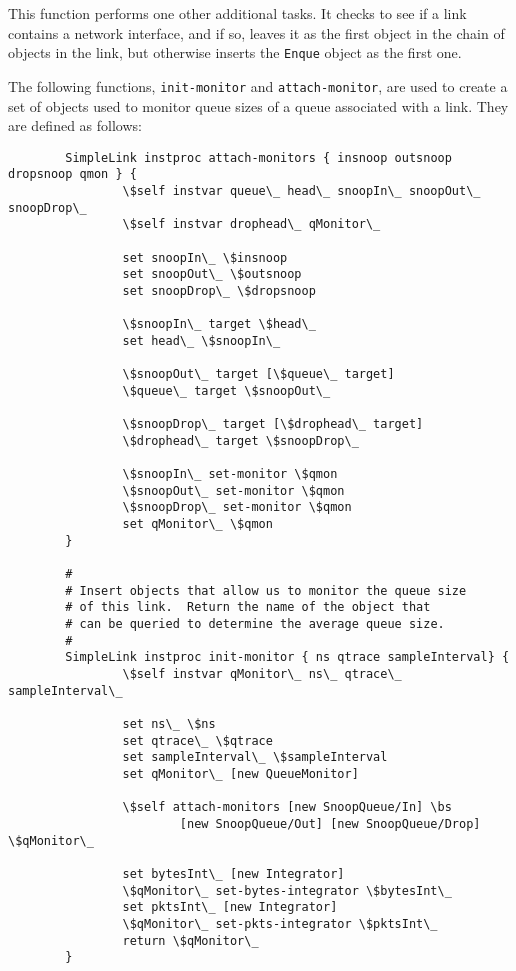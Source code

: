 This function performs one other  additional tasks.
It checks to see if a link contains a network interface,
and if so, leaves it as the first object in the chain of objects
in the link, but otherwise inserts the {\tt Enque} object as
the first one.

The following functions, {\tt init-monitor} and
{\tt attach-monitor}, are used to create a set of
objects used to monitor queue sizes of a queue associated
with a link.
They are defined as follows:
\begin{verbatim}
        SimpleLink instproc attach-monitors { insnoop outsnoop dropsnoop qmon } {
                \$self instvar queue\_ head\_ snoopIn\_ snoopOut\_ snoopDrop\_
                \$self instvar drophead\_ qMonitor\_

                set snoopIn\_ \$insnoop
                set snoopOut\_ \$outsnoop
                set snoopDrop\_ \$dropsnoop

                \$snoopIn\_ target \$head\_
                set head\_ \$snoopIn\_

                \$snoopOut\_ target [\$queue\_ target]
                \$queue\_ target \$snoopOut\_

                \$snoopDrop\_ target [\$drophead\_ target]
                \$drophead\_ target \$snoopDrop\_

                \$snoopIn\_ set-monitor \$qmon
                \$snoopOut\_ set-monitor \$qmon
                \$snoopDrop\_ set-monitor \$qmon
                set qMonitor\_ \$qmon
        }

        #
        # Insert objects that allow us to monitor the queue size
        # of this link.  Return the name of the object that
        # can be queried to determine the average queue size.
        #
        SimpleLink instproc init-monitor { ns qtrace sampleInterval} {
                \$self instvar qMonitor\_ ns\_ qtrace\_ sampleInterval\_

                set ns\_ \$ns
                set qtrace\_ \$qtrace
                set sampleInterval\_ \$sampleInterval
                set qMonitor\_ [new QueueMonitor]

                \$self attach-monitors [new SnoopQueue/In] \bs
                        [new SnoopQueue/Out] [new SnoopQueue/Drop] \$qMonitor\_

                set bytesInt\_ [new Integrator]
                \$qMonitor\_ set-bytes-integrator \$bytesInt\_
                set pktsInt\_ [new Integrator]
                \$qMonitor\_ set-pkts-integrator \$pktsInt\_
                return \$qMonitor\_
        }
\end{verbatim}
